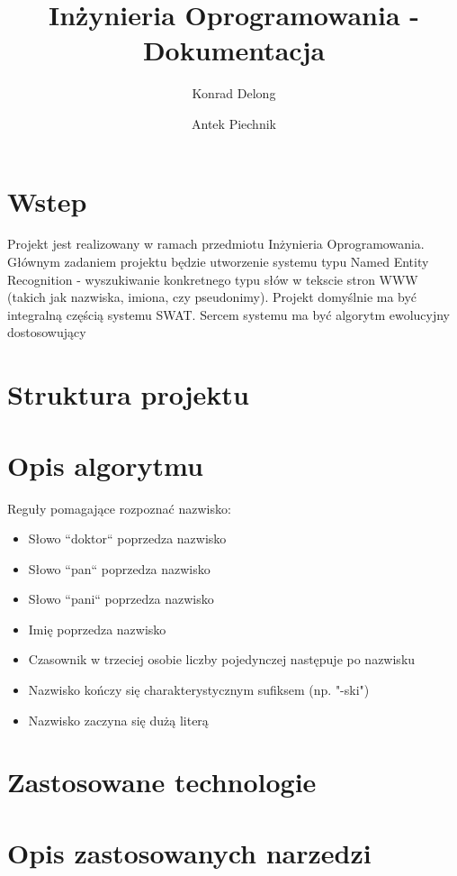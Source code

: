 \documentclass[12pt]{article}
\author{Konrad Delong \and Antek Piechnik}
\title{Inżynieria Oprogramowania - Dokumentacja}
\begin{document}
\maketitle
\tableofcontents
\newpage

\section{Wstep}
Projekt jest realizowany w ramach przedmiotu Inżynieria Oprogramowania. Głównym zadaniem projektu będzie utworzenie systemu typu Named Entity Recognition - wyszukiwanie konkretnego typu słów w tekscie stron WWW (takich jak nazwiska, imiona, czy pseudonimy). Projekt domyślnie ma być integralną częścią systemu SWAT. Sercem systemu ma być algorytm ewolucyjny dostosowujący 
\section{Struktura projektu}
\section{Opis algorytmu}
Reguły pomagające rozpoznać nazwisko:
\begin{itemize}
\item Słowo ``doktor`` poprzedza nazwisko
\item Słowo ``pan`` poprzedza nazwisko
\item Słowo ``pani`` poprzedza nazwisko
\item Imię poprzedza nazwisko
\item Czasownik w trzeciej osobie liczby pojedynczej następuje po nazwisku
\item Nazwisko kończy się charakterystycznym sufiksem (np. "-ski")
\item Nazwisko zaczyna się dużą literą
\end{itemize}

\section{Zastosowane technologie}
\section{Opis zastosowanych narzedzi}
\end{document}
